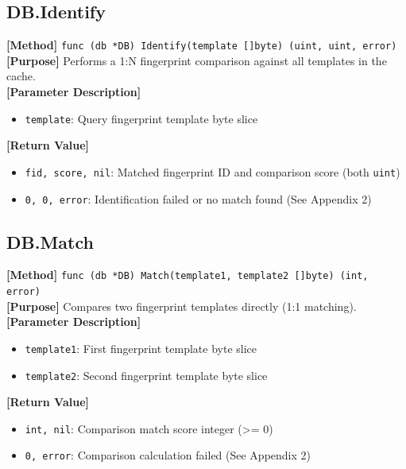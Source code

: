 \documentclass[11pt, a4paper]{article}
\begin{document}
\subsection{DB.Identify}
\textbf{[Method]} \texttt{func (db *DB) Identify(template []byte) (uint, uint, error)} \\
\textbf{[Purpose]} Performs a 1:N fingerprint comparison against all templates in the cache. \\
\textbf{[Parameter Description]} 
\begin{itemize}
    \item \texttt{template}: Query fingerprint template byte slice
\end{itemize}
\textbf{[Return Value]} 
\begin{itemize}
    \item \texttt{fid, score, nil}: Matched fingerprint ID and comparison score (both \texttt{uint})
    \item \texttt{0, 0, error}: Identification failed or no match found (See Appendix 2)
\end{itemize}

\subsection{DB.Match}
\textbf{[Method]} \texttt{func (db *DB) Match(template1, template2 []byte) (int, error)} \\
\textbf{[Purpose]} Compares two fingerprint templates directly (1:1 matching). \\
\textbf{[Parameter Description]} 
\begin{itemize}
    \item \texttt{template1}: First fingerprint template byte slice
    \item \texttt{template2}: Second fingerprint template byte slice
\end{itemize}
\textbf{[Return Value]} 
\begin{itemize}
    \item \texttt{int, nil}: Comparison match score integer (>= 0)
    \item \texttt{0, error}: Comparison calculation failed (See Appendix 2)
\end{itemize}
\end{document}

